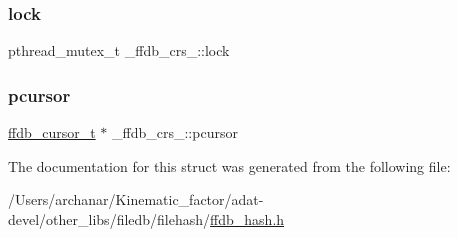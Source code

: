\mbox{\label{struct__ffdb__crs___a91ff97087fd24de639a6efce36da30e2}} 
\subsubsection{\texorpdfstring{lock}{lock}}
{\footnotesize\ttfamily pthread\+\_\+mutex\+\_\+t \+\_\+ffdb\+\_\+crs\+\_\+\+::lock}

\mbox{\label{struct__ffdb__crs___a65452cedb7825f994b11c3c74c3413a5}} 
\subsubsection{\texorpdfstring{pcursor}{pcursor}}
{\footnotesize\ttfamily \mbox{\hyperlink{adat-devel_2other__libs_2filedb_2filehash_2ffdb__db_8h_a1383f6fb3966b0ca74206ba93b687fd9}{ffdb\+\_\+cursor\+\_\+t}} $\ast$ \+\_\+ffdb\+\_\+crs\+\_\+\+::pcursor}



The documentation for this struct was generated from the following file\+:\begin{DoxyCompactItemize}
\item 
/\+Users/archanar/\+Kinematic\+\_\+factor/adat-\/devel/other\+\_\+libs/filedb/filehash/\mbox{\hyperlink{adat-devel_2other__libs_2filedb_2filehash_2ffdb__hash_8h}{ffdb\+\_\+hash.\+h}}\end{DoxyCompactItemize}
